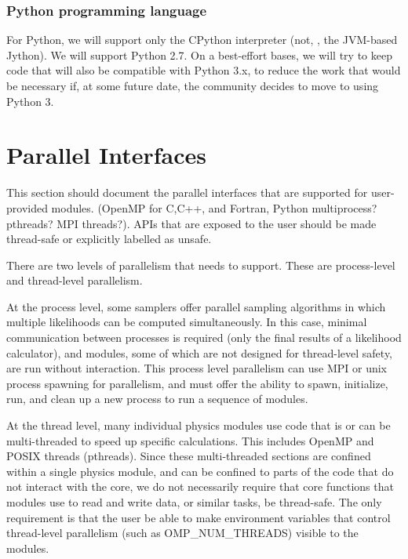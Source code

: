 \documentclass[draftmode,draftwater]{memarticle}
\newcommand{\cosmosis}{\name{CosmoSIS}\xspace}
\begin{document}
\subsubsection{Python programming language}

For Python, we will support only the CPython interpreter (not, \eg, the
JVM-based Jython). We will support Python 2.7. On a best-effort bases,
we will try to keep code that will also be compatible with Python 3.x,
to reduce the work that would be necessary if, at some future date, the
community decides to move to using Python 3.

\section{Parallel Interfaces}

This section should document the parallel interfaces that are supported for
user-provided modules.  (OpenMP for C,C++, and Fortran, Python multiprocess? pthreads? MPI threads?).
APIs that are exposed to the user should be made thread-safe or explicitly labelled
as unsafe.

There are two levels of parallelism that \cosmosis needs to support.  These are
process-level and thread-level parallelism.

At the process level, some samplers 
offer parallel sampling algorithms in which multiple likelihoods can be computed 
simultaneously.  In this case, minimal communication between processes is required
(only the final results of a likelihood calculator), and modules, some of which are
not designed for thread-level safety, are run without interaction.  This process level
parallelism can use MPI or unix process spawning for parallelism, and \cosmosis must offer
the ability to spawn, initialize, run, and clean up a new process to run a sequence of modules.

At the thread level, many individual physics modules use code that is or can be multi-threaded
to speed up specific calculations. This includes OpenMP and POSIX threads (pthreads).  Since these
multi-threaded sections are confined within a single physics module, and can be confined to 
parts of the code that do not interact with the \cosmosis core, we do not necessarily require that core functions
that modules use to read and write data, or similar tasks, be thread-safe.  The only requirement
is that the user be able to make environment variables that control thread-level parallelism
(such as OMP\_NUM\_THREADS) visible to the modules.
\end{document}
